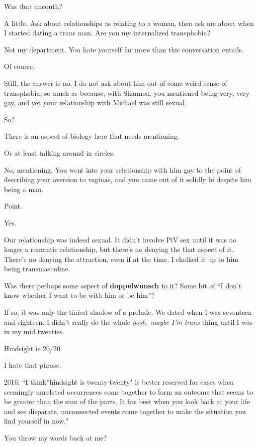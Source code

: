\begin{paracol}{2}
\begin{leftcolumn}
\begin{ally}
Was that uncouth?
\end{ally}
A little. Ask about relationships as relating to a woman, then ask me about when I started dating a trans man. Are you my internalized transphobia?

\begin{ally}
Not my department. You hate yourself far more than this conversation entails.
\end{ally}
Of course.

\begin{ally}
Still, the answer is no. I do not ask about him out of some weird sense of transphobia, so much as because, with Shannon, you mentioned being very, very gay, and yet your relationship with Michael was still sexual.
\end{ally}
So?

\begin{ally}
There is an aspect of biology here that needs mentioning.
\end{ally}
Or at least talking around in circles.

\begin{ally}
No, mentioning. You went into your relationship with him gay to the point of describing your aversion to vaginas, and you came out of it solidly bi despite him being a man.
\end{ally}
Point.

\begin{ally}
Yes.
\end{ally}
Our relationship was indeed sexual. It didn't involve PiV sex until it was no longer a romantic relationship, but there's no denying the that aspect of it. There's no denying the attraction, even if at the time, I chalked it up to him being transmasculine.

\begin{ally}
Was there perhaps some aspect of \textbf{doppelwunsch} to it? Some bit of ``I don't know whether I want to be with him or be him''?
\end{ally}
If so, it was only the tiniest shadow of a prelude. We dated when I was seventeen and eighteen. I didn't really do the whole \emph{gosh, maybe I'm trans} thing until I was in my mid twenties.

\begin{ally}
Hindsight is 20/20.
\end{ally}
I hate that phrase.

\begin{ally}
2016: ``I think''hindsight is twenty-twenty" is better reserved for cases when seemingly unrelated occurrences come together to form an outcome that seems to be greater than the sum of the parts. It fits best when you look back at your life and see disparate, unconnected events come together to make the situation you find yourself in now."
\end{ally}
You throw my words back at me?


\end{leftcolumn}
\end{paracol}
